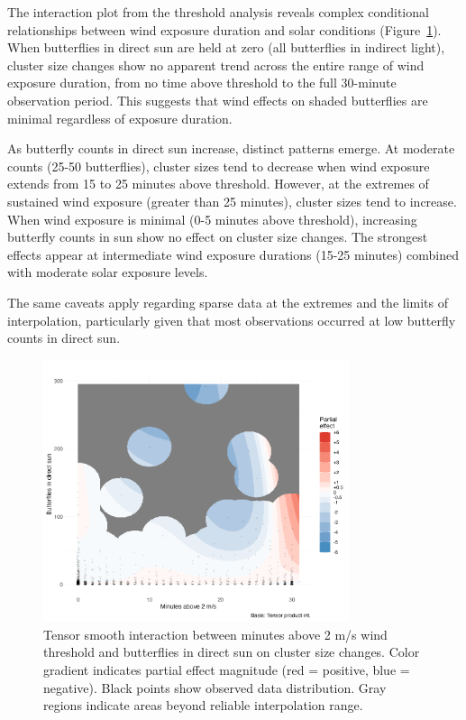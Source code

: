 

The interaction plot from the threshold analysis reveals complex conditional relationships between wind exposure duration and solar conditions (Figure~\ref{fig:threshold_interaction}). When butterflies in direct sun are held at zero (all butterflies in indirect light), cluster size changes show no apparent trend across the entire range of wind exposure duration, from no time above threshold to the full 30-minute observation period. This suggests that wind effects on shaded butterflies are minimal regardless of exposure duration.

As butterfly counts in direct sun increase, distinct patterns emerge. At moderate counts (25-50 butterflies), cluster sizes tend to decrease when wind exposure extends from 15 to 25 minutes above threshold. However, at the extremes of sustained wind exposure (greater than 25 minutes), cluster sizes tend to increase. When wind exposure is minimal (0-5 minutes above threshold), increasing butterfly counts in sun show no effect on cluster size changes. The strongest effects appear at intermediate wind exposure durations (15-25 minutes) combined with moderate solar exposure levels.

The same caveats apply regarding sparse data at the extremes and the limits of interpolation, particularly given that most observations occurred at low butterfly counts in direct sun.

\begin{figure}[htbp]
    \centering
    \includegraphics[width=0.8\textwidth]{supplemental/results/30_min_threshold/figures/interaction_wind_x_sun_binned.png}
    \caption{Tensor smooth interaction between minutes above 2 m/s wind threshold and butterflies in direct sun on cluster size changes. Color gradient indicates partial effect magnitude (red = positive, blue = negative). Black points show observed data distribution. Gray regions indicate areas beyond reliable interpolation range.}
    \label{fig:threshold_interaction}
\end{figure} 

